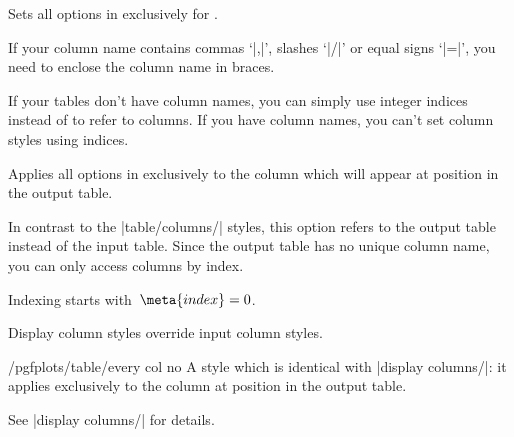 \documentclass[a4paper]{ltxdoc}
\begin{document}
\begin{pgfplotstablecolumnkey}
    Sets all options in  exclusively for .
\begin{codeexample}[]
\end{codeexample}
    If your column name contains commas `|,|', slashes `|/|' or equal signs
    `|=|', you need to enclose the column name in braces.
\begin{codeexample}[narrow]
\end{codeexample}
    If your tables don't have column names, you can simply use integer indices
    instead of  to refer to columns. If you have column
    names, you can't set column styles using indices.
\end{pgfplotstablecolumnkey}

\begin{pgfplotstabledisplaycolumnkey}
    Applies all options in  exclusively to the column
    which will appear at position  in the output table.

    In contrast to the |table/columns/| styles, this option refers
    to the output table instead of the input table. Since the output table has
    no unique column name, you can only access columns by index.

    Indexing starts with~$\meta{index}=0$.

    Display column styles override input column styles.
\end{pgfplotstabledisplaycolumnkey}

\begin{stylekey}{/pgfplots/table/every col no }
    A style which is identical with |display columns/|: it applies
    exclusively to the column at position  in the output table.

    See |display columns/| for details.
\end{stylekey}
\end{document}
